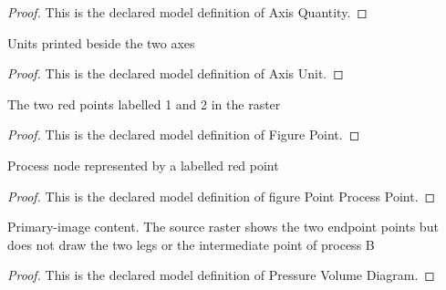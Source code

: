 \begin{proof}
  This is the declared model definition of Axis Quantity.
\end{proof}
\begin{definition}
  \label{def:physics:phyx-mini-0495:phyxminiproblems-problemphyxmini0495-axisunit}
  Units printed beside the two axes
\end{definition}
\begin{proof}
  This is the declared model definition of Axis Unit.
\end{proof}
\begin{definition}
  \label{def:physics:phyx-mini-0495:phyxminiproblems-problemphyxmini0495-figurepoint}
  The two red points labelled 1 and 2 in the raster
\end{definition}
\begin{proof}
  This is the declared model definition of Figure Point.
\end{proof}
\begin{definition}
  \label{def:physics:phyx-mini-0495:phyxminiproblems-problemphyxmini0495-figurepointprocesspoint}
  Process node represented by a labelled red point
\end{definition}
\begin{proof}
  This is the declared model definition of figure Point Process Point.
\end{proof}
\begin{definition}
  \label{def:physics:phyx-mini-0495:phyxminiproblems-problemphyxmini0495-pressurevolumediagram}
  Primary-image content. The source raster shows the two endpoint points but does not draw the two legs or the intermediate point of process B
\end{definition}
\begin{proof}
  This is the declared model definition of Pressure Volume Diagram.
\end{proof}
